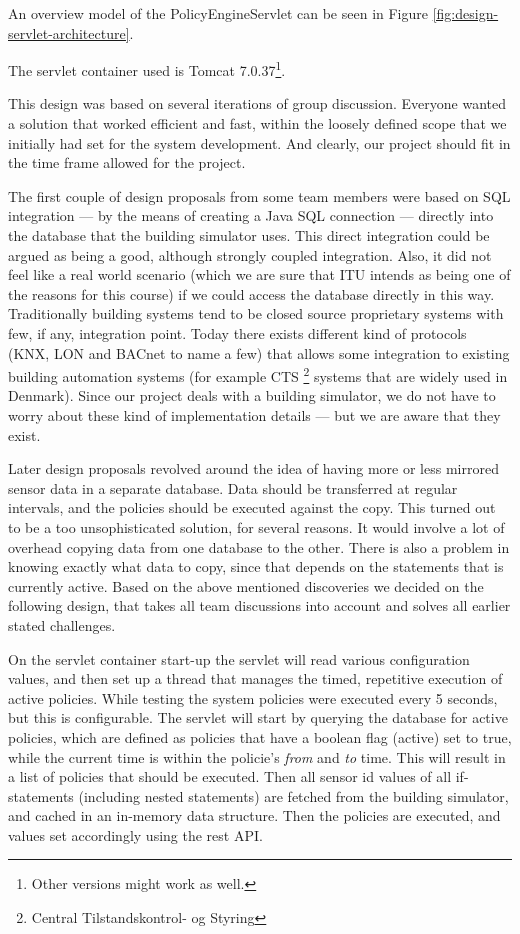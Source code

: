 An overview model of the PolicyEngineServlet can be seen in Figure \ref{fig:design-servlet-architecture}.

The servlet container used is Tomcat 7.0.37\footnote{Other versions might work as well.}. 

This design was based on several iterations of group discussion. Everyone wanted a solution that worked efficient and fast, within the loosely defined scope that we initially had set for the system development. And clearly, our project should fit in the time frame allowed for the project.

The first couple of design proposals from some team members were based on SQL integration --- by the means of creating a Java SQL connection --- directly into the database that the building simulator uses. This direct integration could be argued as being a good, although strongly coupled integration. Also, it did not feel like a real world scenario (which we are sure that ITU intends as being one of the reasons for this course) if we could access the database directly in this way. Traditionally building systems tend to be closed source proprietary systems with few, if any, integration point. Today there exists different kind of protocols (KNX, LON and BACnet to name a few) that allows some integration to existing building automation systems (for example CTS \footnote{Central Tilstandskontrol- og Styring} systems that are widely used in Denmark). Since our project deals with a building simulator, we do not have to worry about these kind of implementation details --- but we are aware that they exist.

Later design proposals revolved around the idea of having more or less mirrored sensor data in a separate database. Data should be transferred at regular intervals, and the policies should be executed against the copy. This turned out to be a too unsophisticated solution, for several reasons. It would involve a lot of overhead copying data from one database to the other. There is also a problem in knowing exactly what data to copy, since that depends on the statements that is currently active. Based on the above mentioned discoveries we decided on the following design, that takes all team discussions into account and solves all earlier stated challenges.

On the servlet container start-up the servlet will read various configuration values, and then set up a thread that manages the timed, repetitive execution of active policies. While testing the system policies were executed every 5 seconds, but this is configurable. The servlet will start by querying the database for active policies, which are defined as policies that have a boolean flag (active) set to true, while the current time is within the policie's \textit{from} and \textit{to} time. This will result in a list of policies that should be executed. Then all sensor id values of all if-statements (including nested statements) are fetched from the building simulator, and cached in an in-memory data structure. Then the policies are executed, and values set accordingly using the rest API.

